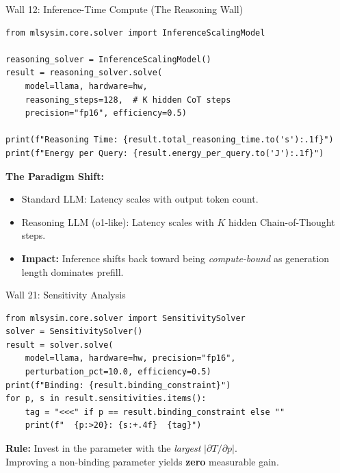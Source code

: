 \documentclass[aspectratio=169, 12pt]{beamer}
\begin{document}
\begin{frame}[fragile]{Wall 12: Inference-Time Compute (The Reasoning Wall)}
\begin{lstlisting}
from mlsysim.core.solver import InferenceScalingModel

reasoning_solver = InferenceScalingModel()
result = reasoning_solver.solve(
    model=llama, hardware=hw,
    reasoning_steps=128,  # K hidden CoT steps
    precision="fp16", efficiency=0.5)

print(f"Reasoning Time: {result.total_reasoning_time.to('s'):.1f}")
print(f"Energy per Query: {result.energy_per_query.to('J'):.1f}")
\end{lstlisting}

\vspace{0.3em}
\small
\textbf{The Paradigm Shift:}
\begin{itemize}
  \item Standard LLM: Latency scales with output token count.
  \item Reasoning LLM (o1-like): Latency scales with $K$ hidden Chain-of-Thought steps.
  \item \textbf{Impact:} Inference shifts back toward being \emph{compute-bound} as generation length dominates prefill.
\end{itemize}
\end{frame}

\begin{frame}[fragile]{Wall 21: Sensitivity Analysis}
\begin{lstlisting}
from mlsysim.core.solver import SensitivitySolver
solver = SensitivitySolver()
result = solver.solve(
    model=llama, hardware=hw, precision="fp16",
    perturbation_pct=10.0, efficiency=0.5)
print(f"Binding: {result.binding_constraint}")
for p, s in result.sensitivities.items():
    tag = "<<<" if p == result.binding_constraint else ""
    print(f"  {p:>20}: {s:+.4f}  {tag}")
\end{lstlisting}

\vspace{0.3em}
\small
\textbf{Rule:} Invest in the parameter with the \emph{largest} $|\partial T / \partial p|$.\\
Improving a non-binding parameter yields \textbf{zero} measurable gain.
\end{frame}
\end{document}

